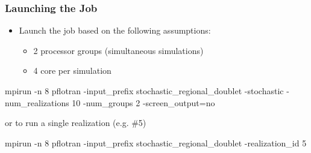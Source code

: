 \documentclass{beamer}
\begin{document}
\begin{frame}[fragile]\frametitle{Launching the Job}

\begin{itemize}
  \item Launch the job based on the following assumptions:
  \begin{itemize}
    \item 2 processor groups (simultaneous simulations)
    \item 4 core per simulation
  \end{itemize}

\end{itemize}

\begin{semiverbatim}
mpirun -n 8 pflotran
  -input_prefix stochastic_regional_doublet
  -stochastic
  -num_realizations 10
  -num_groups 2
  -screen_output=no
\end{semiverbatim}

or to run a single realization (e.g. \#5)

\begin{semiverbatim}
mpirun -n 8 pflotran
  -input_prefix stochastic_regional_doublet
  -realization_id 5
\end{semiverbatim}

\end{frame}
\end{document}
